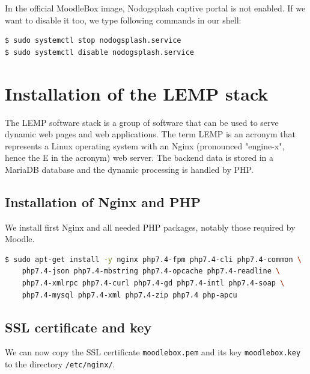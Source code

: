 \documentclass[12pt]{article}
\begin{document}
In the official MoodleBox image, Nodogsplash captive portal is not enabled.
If we want to disable it too, we type following commands in our shell:
\begin{lstlisting}[language=bash]
$ sudo systemctl stop nodogsplash.service
$ sudo systemctl disable nodogsplash.service
\end{lstlisting}

\section{Installation of the LEMP stack}

The LEMP software stack is a group of software that can be used to serve dynamic web pages and web applications.
The term LEMP is an acronym that represents a Linux operating system with an Nginx (pronounced "engine-x", hence the E in the acronym) web server.
The backend data is stored in a MariaDB database and the dynamic processing is handled by PHP.

\subsection{Installation of Nginx and PHP}\label{ssec-nginx-php-installation}

We install first Nginx and all needed PHP packages, notably those required by Moodle.

\begin{lstlisting}[language=bash]
$ sudo apt-get install -y nginx php7.4-fpm php7.4-cli php7.4-common \
    php7.4-json php7.4-mbstring php7.4-opcache php7.4-readline \
    php7.4-xmlrpc php7.4-curl php7.4-gd php7.4-intl php7.4-soap \
    php7.4-mysql php7.4-xml php7.4-zip php7.4 php-apcu
\end{lstlisting}

\subsection{SSL certificate and key}

We can now copy the SSL certificate \lstinline{moodlebox.pem} and its key \lstinline{moodlebox.key} to the directory \lstinline{/etc/nginx/}.
\end{document}
